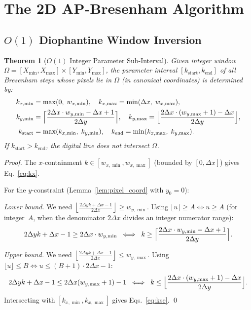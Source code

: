 \documentclass[12pt,a4paper]{article}
\newtheorem{theorem}{Theorem}[section]
\theoremstyle{definition}
\newcommand{\dx}{\Delta x}
\newcommand{\dy}{\Delta y}
\newcommand{\kst}{k_{\mathrm{start}}}
\newcommand{\ken}{k_{\mathrm{end}}}
\newcommand{\lfl}{\left\lfloor}
\newcommand{\rfl}{\right\rfloor}
\begin{document}
\section{The 2D AP-Bresenham Algorithm}
\label{sec:algo}

\subsection{$O(1)$ Diophantine Window Inversion}

\begin{theorem}[$O(1)$ Integer Parameter Sub-Interval]
\label{thm:diophantine_bounds}
Given integer window $\Omega = [X_{\min}, X_{\max}] \times
[Y_{\min}, Y_{\max}]$, the parameter interval
$[\kst, \ken]$ of all Bresenham steps whose pixels lie
in $\Omega$ (in canonical coordinates) is determined by:
\begin{align}
  k_{x,\min} &= \max(0,\; w_{x,\min}),\quad
  k_{x,\max} = \min(\dx,\; w_{x,\max}),\label{eq:kx}\\
  k_{y,\min} &= \Bigl\lceil \frac{2\dx\cdot w_{y,\min}
    - \dx + 1}{2\dy} \Bigr\rceil,\quad
  k_{y,\max} = \Bigl\lfloor \frac{2\dx\cdot(w_{y,\max}+1)
    - \dx}{2\dy} \Bigr\rfloor,\label{eq:ky}\\
  \kst &= \max(k_{x,\min},\; k_{y,\min}),\quad
  \ken = \min(k_{x,\max},\; k_{y,\max}).\label{eq:kse}
\end{align}
If $\kst > \ken$, the digital line does not intersect
$\Omega$.
\end{theorem}

\begin{proof}
The $x$-containment $k \in [w_{x,\min}, w_{x,\max}]$
(bounded by $[0,\dx]$) gives Eq.~\eqref{eq:kx}.

For the $y$-constraint (Lemma~\ref{lem:pixel_coord}
with $y_0 = 0$):

\noindent\emph{Lower bound.} We need
$\lfl\frac{2\dy k + \dx - 1}{2\dx}\rfl \ge w_{y,\min}$.
Using $\lfloor u \rfloor \ge A \iff u \ge A$ (for
integer~$A$, when the denominator $2\dx$ divides an
integer numerator range):
\[
  2\dy k + \dx - 1 \ge 2\dx \cdot w_{y,\min}
  \;\iff\; k \ge \Bigl\lceil
  \frac{2\dx\cdot w_{y,\min} - \dx + 1}{2\dy}
  \Bigr\rceil.
\]

\noindent\emph{Upper bound.} We need
$\lfl\frac{2\dy k + \dx - 1}{2\dx}\rfl \le w_{y,\max}$.
Using $\lfloor u \rfloor \le B \iff u \le (B+1)\cdot
2\dx - 1$:
\[
  2\dy k + \dx - 1 \le 2\dx(w_{y,\max}+1) - 1
  \;\iff\; k \le \Bigl\lfloor
  \frac{2\dx\cdot(w_{y,\max}+1) - \dx}{2\dy}
  \Bigr\rfloor.
\]
Intersecting with $[k_{x,\min}, k_{x,\max}]$ gives
Eqs.~\eqref{eq:kse}. \qed
\end{proof}
\end{document}
